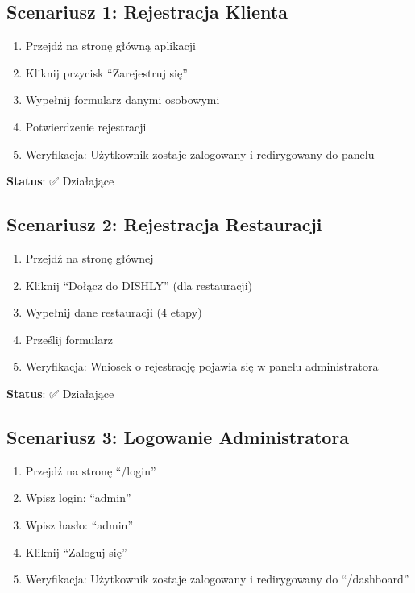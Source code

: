 \documentclass[12pt,a4paper,utf-8]{article}
\begin{document}
\newpage

\subsection{Scenariusz 1: Rejestracja Klienta}

\begin{enumerate}
    \item Przejdź na stronę główną aplikacji
    \item Kliknij przycisk ``Zarejestruj się''
    \item Wypełnij formularz danymi osobowymi
    \item Potwierdzenie rejestracji
    \item Weryfikacja: Użytkownik zostaje zalogowany i redirygowany do panelu
\end{enumerate}

\textbf{Status}: ✅ Działające

\subsection{Scenariusz 2: Rejestracja Restauracji}

\begin{enumerate}
    \item Przejdź na stronę głównej
    \item Kliknij ``Dołącz do DISHLY'' (dla restauracji)
    \item Wypełnij dane restauracji (4 etapy)
    \item Prześlij formularz
    \item Weryfikacja: Wniosek o rejestrację pojawia się w panelu administratora
\end{enumerate}

\textbf{Status}: ✅ Działające

\subsection{Scenariusz 3: Logowanie Administratora}

\begin{enumerate}
    \item Przejdź na stronę ``/login''
    \item Wpisz login: ``admin''
    \item Wpisz hasło: ``admin''
    \item Kliknij ``Zaloguj się''
    \item Weryfikacja: Użytkownik zostaje zalogowany i redirygowany do ``/dashboard''
\end{enumerate}
\end{document}
